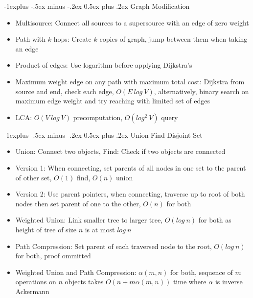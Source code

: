 \documentclass[10pt, landscape]{article}
\makeatletter
\renewcommand{\section}{\@startsection{section}{1}{0mm}%
                                {-1ex plus -.5ex minus -.2ex}%
                                {0.5ex plus .2ex}%
                                {\normalfont\large\bfseries}}
\renewcommand{\section}{\@startsection{section}{2}{0mm}%
                                {-1explus -.5ex minus -.2ex}%
                                {0.5ex plus .2ex}%
                                {\normalfont\normalsize\bfseries}}
\makeatother
\begin{document}
\begin{multicols*}{4}
\section{Graph Modification}
\begin{itemize}
    \item Multisource: Connect all sources to a supersource with an edge of zero weight
    \item Path with $k$ hops: Create $k$ copies of graph, jump between them when taking an edge
    \item Product of edges: Use logarithm before applying Dijkstra's
    \item Maximum weight edge on any path with maximum total cost: Dijkstra from source and end, check each edge, $O(E\ log \ V)$, alternatively, binary search on maximum edge weight and try reaching with limited set of edges
    \item LCA: $O(V \ log \ V)$ precomputation, $O(log^2\ V)$ query
\end{itemize}

\section{Union Find Disjoint Set}
\begin{itemize}
    \item Union: Connect two objects, Find: Check if two objects are connected
    \item Version 1: When connecting, set parents of all nodes in one set to the parent of other set, $O(1)$ find, $O(n)$ union
    \item Version 2: Use parent pointers, when connecting, traverse up to root of both nodes then set parent of one to the other, $O(n)$ for both
    \item Weighted Union: Link smaller tree to larger tree, $O(log \ n)$ for both as height of tree of size $n$ is at most $log \ n$
    \item Path Compression: Set parent of each traversed node to the root, $O(log \ n)$ for both, proof ommitted
    \item Weighted Union and Path Compression: $\alpha(m, n)$ for both, sequence of $m$ operations on $n$ objects takes $O(n+m\alpha(m, n))$ time where $\alpha$ is inverse Ackermann
\end{itemize}


\end{multicols*}
\end{document}
